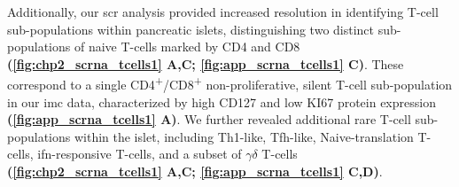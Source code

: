 \par Additionally, our \gls{scr} analysis provided increased resolution in identifying T-cell sub-populations within pancreatic islets, distinguishing two distinct sub-populations of naive T-cells marked by CD4 and CD8 \textbf{(\autoref{fig:chp2_scrna_tcells1} A,C; \autoref{fig:app_scrna_tcells1} C)}. These correspond to a single CD4\textsuperscript{+}/CD8\textsuperscript{+} non-proliferative, silent T-cell sub-population in our \gls{imc} data, characterized by high CD127 and low KI67 protein expression \textbf{(\autoref{fig:app_scrna_tcells1} A)}. We further revealed additional rare T-cell sub-populations within the islet, including Th1-like, Tfh-like, Naive-translation T-cells, \gls{ifn}-responsive T-cells, and a subset of $\gamma\delta$ T-cells \textbf{(\autoref{fig:chp2_scrna_tcells1} A,C; \autoref{fig:app_scrna_tcells1} C,D)}.\\



